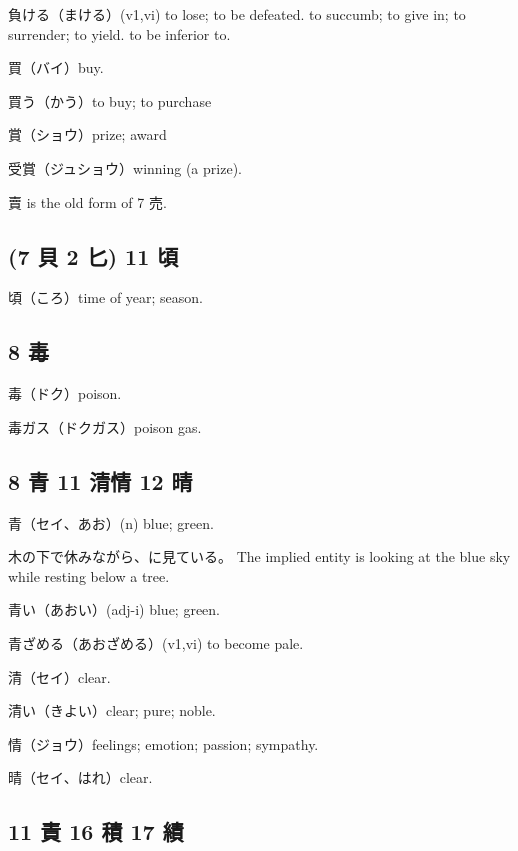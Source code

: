 負ける（まける）(v1,vi)
to lose; to be defeated.
to succumb; to give in; to surrender; to yield.
to be inferior to.

買（バイ）buy.

買う（かう）to buy; to purchase

賞（ショウ）prize; award

受賞（ジュショウ）winning (a prize).

賣 is the old form of 7 売.

\subsection{(7 貝 2 匕) 11 頃}

頃（ころ）time of year; season.


\subsection{8 毒}

毒（ドク）poison.

毒ガス（ドクガス）poison gas.

\subsection{8 青 11 清情 12 晴}

青（セイ、あお）(n) blue; green.

木の下で休みながら、に見ている。
The implied entity is looking at the blue sky while resting below a tree.

青い（あおい）(adj-i) blue; green.

青ざめる（あおざめる）(v1,vi) to become pale.

清（セイ）clear.

清い（きよい）clear; pure; noble.

情（ジョウ）feelings; emotion; passion; sympathy.

晴（セイ、はれ）clear.

\subsection{11 責 16 積 17 績}

